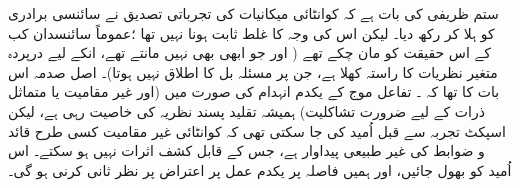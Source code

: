 ستم ظریفی کی بات ہے کہ کوانٹائی میکانیات کی تجرباتی تصدیق نے سائنسی برادری کو ہلا کر رکھ دیا۔ لیکن اس کی وجہ    کا غلط ثابت ہونا نہیں تھا ؛عموماً سائنسدان کب کے اس حقیقت کو مان چکے تھے ( اور جو ابھی بھی  نہیں مانتے تھے،   انکے لیے   درپردہ متغیر نظریات کا راستہ  کھلا ہے،  جن پر  مسئلہ  بل کا  اطلاق  نہیں ہوتا)۔ اصل صدمہ  اس بات کا تھا کہ ۔ تفاعل موج کے  یکدم  انہدام کی صورت میں (اور  غیر مقامیت یا متماثل ذرات کے لیے ضرورت تشاکلیت)  ہمیشہ تقلید پسند نظریہ کی خاصیت رہی ہے،  لیکن  اسپکٹ   تجربہ سے قبل اُمید کی جا سکتی تھی کہ کوانٹائی غیر مقامیت کسی طرح قائد و ضوابط کی غیر طبیعی پیداوار  ہے،  جس کے قابل کشف اثرات نہیں ہو سکتے۔  اس اُمید کو بھول جائیں، اور  ہمیں فاصلہ پر یکدم عمل  پر اعتراض  پر  نظر ثانی   کرنی ہو گی۔

